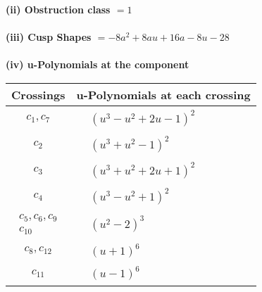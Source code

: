 \documentclass[1p]{elsarticle_modified}
\theoremstyle{definition}
\begin{document}
\flushleft \textbf{(ii) Obstruction class $= 1$}\\~\\
\flushleft \textbf{(iii) Cusp Shapes $= -8 a^2+8 a u+16 a-8 u-28$}\\~\\
\newpage\renewcommand{\arraystretch}{1}
\flushleft \textbf{(iv) u-Polynomials at the component}\newline \\
\begin{tabular}{m{50pt}|m{274pt}}
Crossings & \hspace{64pt}u-Polynomials at each crossing \\
\hline $$\begin{aligned}c_{1},c_{7}\end{aligned}$$&$\begin{aligned}
&(u^3- u^2+2 u-1)^2
\end{aligned}$\\
\hline $$\begin{aligned}c_{2}\end{aligned}$$&$\begin{aligned}
&(u^3+u^2-1)^2
\end{aligned}$\\
\hline $$\begin{aligned}c_{3}\end{aligned}$$&$\begin{aligned}
&(u^3+u^2+2 u+1)^2
\end{aligned}$\\
\hline $$\begin{aligned}c_{4}\end{aligned}$$&$\begin{aligned}
&(u^3- u^2+1)^2
\end{aligned}$\\
\hline $$\begin{aligned}c_{5},c_{6},c_{9}\\c_{10}\end{aligned}$$&$\begin{aligned}
&(u^2-2)^3
\end{aligned}$\\
\hline $$\begin{aligned}c_{8},c_{12}\end{aligned}$$&$\begin{aligned}
&(u+1)^6
\end{aligned}$\\
\hline $$\begin{aligned}c_{11}\end{aligned}$$&$\begin{aligned}
&(u-1)^6
\end{aligned}$\\
\hline
\end{tabular}\\~\\
\end{document}
